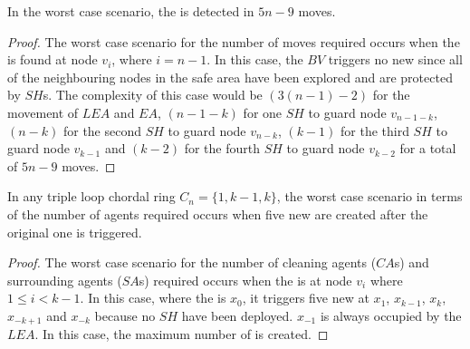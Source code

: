 \begin{theorem}
In the worst case scenario, the \bv is detected in $5n-9$ moves.
 
\end{theorem}
\begin{proof}
The worst case scenario for the number of moves required occurs when the \bv  is found at node $v_i$, where $i=n-1$.
  In this case, the $BV$ triggers no new \bvs since all of the neighbouring nodes in the safe area have been explored and are protected by $SH$s.
% 
 The complexity of this case would be $(3(n-1)-2)$ for the movement of $LEA$ and $EA$, $(n-1-k)$ for one $SH$ to guard node $v_{n-1-k}$, $(n-k)$ for the second $SH$ to guard node $v_{n-k}$, $(k-1)$ for the third $SH$ to guard node $v_{k-1}$ and $(k-2)$ for the fourth $SH$ to guard node $v_{k-2}$ for a total of $5n-9$ moves.
\end{proof}
\begin{theorem}
In any triple loop chordal ring $C_n=\{1,k-1,k\}$, the worst case scenario in terms of the number of agents required occurs when five new \bvs are created after the original one is triggered. 
\end{theorem}

\begin{proof}
The worst case scenario for the number of cleaning agents ($CA$s) and surrounding agents ($SA$s) required occurs when the \bv is at node $v_i$ where $ 1\leq i < k-1$. In this case, where the \bv is $x_0$, it  triggers five new \bvs at $x_1$, $x_{k-1}$, $x_k$, $x_{-k+1}$ and $x_{-k}$ because no $SH$ have been deployed. $x_{-1} $ is always occupied by the $LEA$. In this case, the maximum number of \bvs is created.
\end{proof}




